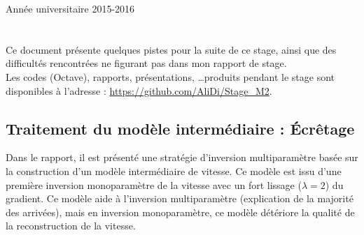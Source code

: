 \documentclass[a4paper,11pt]{report} %
\begin{document}
\begin{titlepage}
\vfill
{\large Année universitaire 2015-2016}\\[3cm] %
 



 



\end{titlepage}
\chapter*{}
Ce document présente quelques pistes pour la suite de ce stage, ainsi que des difficultés rencontrées ne figurant pas dans mon rapport de stage.\\

Les codes (Octave), rapports, présentations, \ldots produits pendant le stage sont disponibles à l'adresse : \url{https://github.com/AliDi/Stage_M2}.

\section{Traitement du modèle intermédiaire : Écrêtage}
Dans le rapport, il est présenté une stratégie d'inversion multiparamètre basée sur la construction d'un modèle intermédiaire de vitesse. Ce modèle est issu d'une première inversion monoparamètre de la vitesse avec un fort lissage ($\lambda=2$) du gradient. Ce modèle aide à l'inversion multiparamètre (explication de la majorité des arrivées), mais en inversion monoparamètre, ce modèle détériore la qualité de la reconstruction de la vitesse.\\
\end{document}
